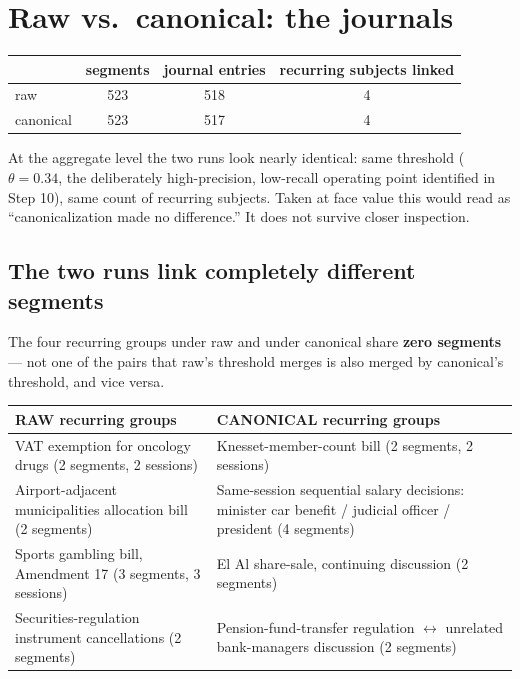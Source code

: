 \documentclass[11pt,a4paper]{article}
\begin{document}
\section{Raw vs.\ canonical: the journals}

\begin{center}
\begin{tabular}{lccc}
\toprule
 & segments & journal entries & recurring subjects linked \\
\midrule
raw & 523 & 518 & 4 \\
canonical & 523 & 517 & 4 \\
\bottomrule
\end{tabular}
\end{center}

At the aggregate level the two runs look nearly identical: same threshold ($\theta=0.34$,
the deliberately high-precision, low-recall operating point identified in Step 10), same
count of recurring subjects. Taken at face value this would read as ``canonicalization made
no difference.'' It does not survive closer inspection.

\subsection{The two runs link completely different segments}

The four recurring groups under raw and under canonical share \textbf{zero segments} ---
not one of the pairs that raw's threshold merges is also merged by canonical's threshold,
and vice versa.

\begin{center}
\begin{tabular}{p{6.8cm}p{6.8cm}}
\toprule
\textbf{RAW recurring groups} & \textbf{CANONICAL recurring groups} \\
\midrule
VAT exemption for oncology drugs (2 segments, 2 sessions) &
  Knesset-member-count bill (2 segments, 2 sessions) \\
Airport-adjacent municipalities allocation bill (2 segments) &
  Same-session sequential salary decisions: minister car benefit / judicial officer /
  president (4 segments) \\
Sports gambling bill, Amendment 17 (3 segments, 3 sessions) &
  El Al share-sale, continuing discussion (2 segments) \\
Securities-regulation instrument cancellations (2 segments) &
  Pension-fund-transfer regulation $\leftrightarrow$ unrelated bank-managers discussion
  (2 segments) \\
\bottomrule
\end{tabular}
\end{center}
\end{document}
